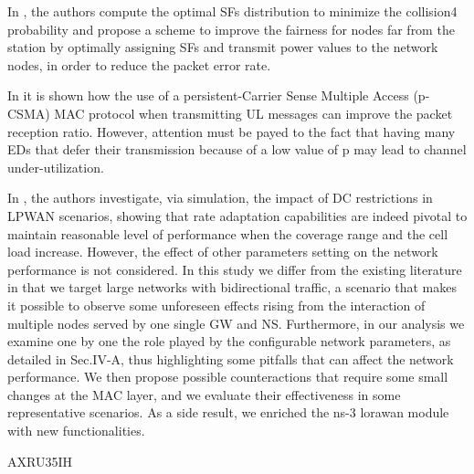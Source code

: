 In \cite{reynders_power_2017},
	the authors compute the optimal SFs distribution to minimize the collision4 probability and propose a scheme to improve the fairness for nodes far from the station by optimally assigning SFs and transmit power values to the network nodes,
	in order to reduce the packet error rate.

In \cite{kouvelas_employing_2018} it is shown how the use of a persistent-Carrier Sense Multiple Access (p-CSMA) MAC protocol when transmitting UL messages can improve the packet reception ratio.
However,
	attention must be payed to the fact that having many EDs that defer their transmission because of a low value of p may lead to channel under-utilization.

In \cite{zucchetto_uncoordinated_2017},
	the authors investigate,
	via simulation,
	the impact of DC restrictions in LPWAN scenarios,
	showing that rate adaptation capabilities are indeed pivotal to maintain reasonable level of performance when the coverage range and the cell load increase.
However,
	the effect of other parameters setting on the network performance is not considered.
In this study we differ from the existing literature in that we target large networks with bidirectional traffic,
	a scenario that makes it possible to observe some unforeseen effects rising from the interaction of multiple nodes served by one single GW and NS.
Furthermore,
	in our analysis we examine one by one the role played by the configurable network parameters,
	as detailed in Sec.IV-A,
	thus highlighting some pitfalls that can affect the network performance.
We then propose possible counteractions that require some small changes at the MAC layer,
	and we evaluate their effectiveness in some representative scenarios.
As a side result,
	we enriched the ns-3 lorawan module with new functionalities.

\cite{marais_evaluating_2019} AXRU35IH

